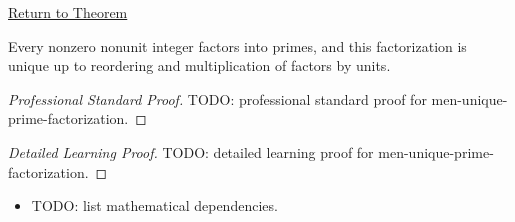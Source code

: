 \newpage
{}
\label{prf:men-unique-prime-factorization}

\begin{remark*}[Return]
\hyperref[thm:men-unique-prime-factorization]{Return to Theorem}
\end{remark*}

\begin{theorem*}
Every nonzero nonunit integer factors into primes, and this factorization is
unique up to reordering and multiplication of factors by units.
\end{theorem*}

\begin{proof}[Professional Standard Proof]
\LRAProofBodyStart
TODO: professional standard proof for men-unique-prime-factorization.
\end{proof}

\begin{proof}[Detailed Learning Proof]
\LRAProofBodyStart
TODO: detailed learning proof for men-unique-prime-factorization.
\end{proof}

\begin{remark*}
\end{remark*}

\begin{dependencies}
\begin{itemize}
  \item TODO: list mathematical dependencies.
\end{itemize}
\end{dependencies}

\clearpage
